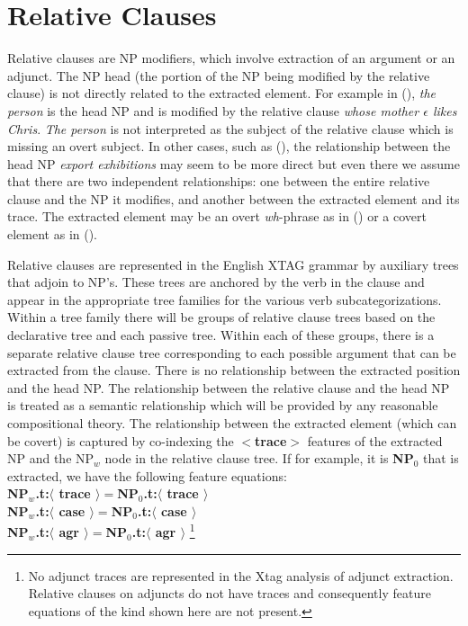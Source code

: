\chapter{Relative Clauses}
\label{rel_clauses}

Relative clauses are NP modifiers, which involve extraction of
an argument or an adjunct. The NP head (the
portion of the NP being modified by the relative clause) is 
not directly related to the extracted element. 
For example in (), {\it the person} is the head NP
and is modified by the relative clause {\it whose mother $\epsilon$ 
likes Chris}. {\em The person} is not interpreted as the subject of the
relative clause which is missing an overt subject. In other cases, such
as (), the relationship between the head NP {\em export exhibitions}
may seem to be more direct but even there we assume that there are two
independent relationships: one between the entire relative clause
and the NP it modifies, and another between the extracted element
and its trace. The extracted element may be an overt {\em wh}-phrase
as in () or a covert element as in (). 


Relative clauses are represented in the English XTAG grammar by auxiliary trees
that adjoin to NP's. These trees are anchored by the verb in the clause and
appear in the appropriate tree families for the various verb
subcategorizations. Within a tree family there will be groups of relative
clause trees based on the declarative tree and each passive tree. Within each
of these groups, there is a separate relative clause tree corresponding to each
possible argument that can be extracted from the clause. There is
no  relationship between the extracted position and the head NP.
The relationship between the relative clause and the head NP is treated
as a semantic relationship which will be provided by any reasonable
compositional theory. The relationship between the extracted element
(which can be covert) is captured by co-indexing the
{\bf $<$trace$>$} features of the extracted NP and the NP$_{w}$ node in the
relative clause tree. If for example, it is {\bf NP$_{0}$} that is extracted,
we have the following feature equations:\\
{\bf NP$_{w}$.t:$\langle$ trace $\rangle =$NP$_{0}$.t:$\langle$ trace $\rangle$}\\
{\bf NP$_{w}$.t:$\langle$ case $\rangle =$NP$_{0}$.t:$\langle$ case $\rangle$}\\
{\bf NP$_{w}$.t:$\langle$ agr $\rangle =$NP$_{0}$.t:$\langle$ agr $\rangle$}
\footnote{
No adjunct traces are represented in the Xtag analysis of adjunct extraction.
Relative clauses on adjuncts do not have traces and consequently feature
equations of the kind shown here are not present.}

